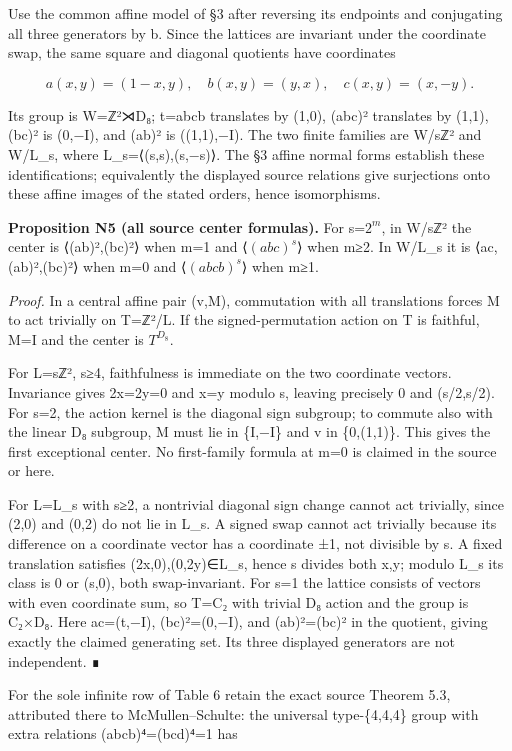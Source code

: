 \documentclass[
  11pt,
  a4paper,
]{article}
\begin{document}
Use the common affine model of §3 after reversing its endpoints and
conjugating all three generators by b. Since the lattices are invariant
under the coordinate swap, the same square and diagonal quotients have
coordinates

\[
a(x,y)=(1-x,y),\quad b(x,y)=(y,x),\quad c(x,y)=(x,-y).
\tag{N5}
\]

Its group is W=ℤ²⋊D₈; t=abcb translates by (1,0), (abc)² translates by
(1,1), (bc)² is (0,−I), and (ab)² is ((1,1),−I). The two finite families
are W/sℤ² and W/L\_s, where L\_s=⟨(s,s),(s,−s)⟩. The §3 affine normal
forms establish these identifications; equivalently the displayed source
relations give surjections onto these affine images of the stated
orders, hence isomorphisms.

\textbf{Proposition N5 (all source center formulas).} For s=\(2^{m}\),
in W/sℤ² the center is ⟨(ab)²,(bc)²⟩ when m=1 and ⟨\((abc)^{s}\)⟩ when
m≥2. In W/L\_s it is ⟨ac,(ab)²,(bc)²⟩ when m=0 and ⟨\((abcb)^{s}\)⟩ when
m≥1.

\emph{Proof.} In a central affine pair (v,M), commutation with all
translations forces M to act trivially on T=ℤ²/L. If the
signed-permutation action on T is faithful, M=I and the center is
\(T^{D_8}\).

For L=sℤ², s≥4, faithfulness is immediate on the two coordinate vectors.
Invariance gives 2x=2y=0 and x=y modulo s, leaving precisely 0 and
(s/2,s/2). For s=2, the action kernel is the diagonal sign subgroup; to
commute also with the linear D₈ subgroup, M must lie in \{I,−I\} and v
in \{0,(1,1)\}. This gives the first exceptional center. No first-family
formula at m=0 is claimed in the source or here.

For L=L\_s with s≥2, a nontrivial diagonal sign change cannot act
trivially, since (2,0) and (0,2) do not lie in L\_s. A signed swap
cannot act trivially because its difference on a coordinate vector has a
coordinate ±1, not divisible by s. A fixed translation satisfies
(2x,0),(0,2y)∈L\_s, hence s divides both x,y; modulo L\_s its class is 0
or (s,0), both swap-invariant. For s=1 the lattice consists of vectors
with even coordinate sum, so T=C₂ with trivial D₈ action and the group
is C₂×D₈. Here ac=(t,−I), (bc)²=(0,−I), and (ab)²=(bc)² in the quotient,
giving exactly the claimed generating set. Its three displayed
generators are not independent. ∎

For the sole infinite row of Table 6 retain the exact source Theorem
5.3, attributed there to McMullen--Schulte: the universal type-\{4,4,4\}
group with extra relations (abcb)⁴=(bcd)⁴=1 has
\end{document}

